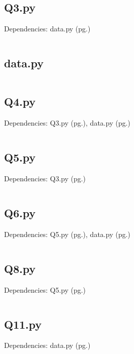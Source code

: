 \documentclass[a4paper]{article}
\begin{document}
\pagebreak
\subsection*{Q3.py}\label{PQ3}
Dependencies: data.py (pg.\pageref{Pdata})
\inputminted[frame=single,linenos,framesep=2mm,baselinestretch=1]{python}{Q3.py}

\pagebreak
\subsection*{data.py}\label{Pdata}
\inputminted[frame=single,linenos,framesep=2mm,baselinestretch=1]{python}{data.py}


\pagebreak
\subsection*{Q4.py}\label{PQ4}
Dependencies: Q3.py (pg.\pageref{PQ3}), data.py (pg.\pageref{Pdata})
\inputminted[frame=single,linenos,framesep=2mm,baselinestretch=1]{python}{Q4.py}

\subsection*{Q5.py}\label{PQ5}
Dependencies: Q3.py (pg.\pageref{PQ3})
\inputminted[frame=single,linenos,framesep=2mm,baselinestretch=1]{python}{Q5.py}

\subsection*{Q6.py}\label{PQ6}
Dependencies: Q5.py (pg.\pageref{PQ5}), data.py (pg.\pageref{Pdata})
\inputminted[frame=single,linenos,framesep=2mm,baselinestretch=1]{python}{Q6.py}

\newpage
\subsection*{Q8.py}\label{PQ8}
Dependencies: Q5.py (pg.\pageref{PQ5})
\inputminted[frame=single,linenos,framesep=2mm,baselinestretch=1]{python}{Q8.py}

\newpage
\subsection*{Q11.py}\label{PQ11}
Dependencies: data.py (pg.\pageref{Pdata})
\inputminted[frame=single,linenos,framesep=2mm,baselinestretch=1]{python}{Q11.py}


\end{document}
